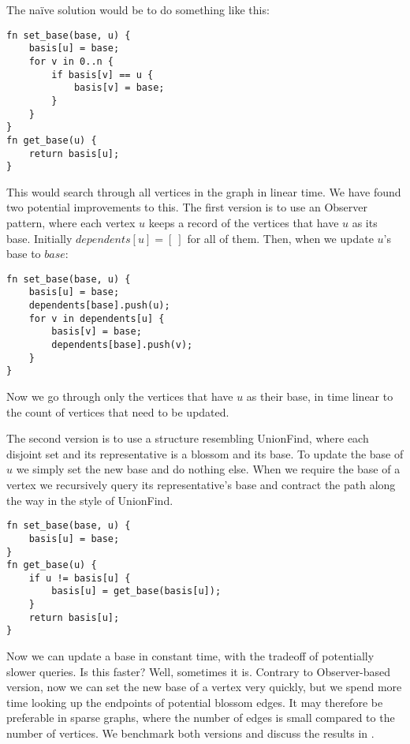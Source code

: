 The naïve solution would be to do something like this:
\begin{lstlisting}[caption={Näive basis},label=Listing,mathescape=true]
fn set_base(base, u) {
    basis[u] = base;
    for v in 0..n {
        if basis[v] == u {
            basis[v] = base;
        }
    }
}
fn get_base(u) {
    return basis[u];
}
\end{lstlisting}
This would search through all vertices in the graph in linear time. We have found two potential improvements to this. The first version is to use an Observer pattern, where each vertex $u$ keeps a record of the vertices that have $u$ as its base. Initially $dependents[u] = [~]$ for all of them. Then, when we update $u$'s base to $base$:

\begin{lstlisting}[caption={Observer basis},label=Listing,mathescape=true]
fn set_base(base, u) {
    basis[u] = base;
    dependents[base].push(u);
    for v in dependents[u] {
        basis[v] = base;
        dependents[base].push(v);
    }
}
\end{lstlisting}

Now we go through only the vertices that have $u$ as their base, in time linear to the count of vertices that need to be updated.

The second version is to use a structure resembling UnionFind, where each disjoint set and its representative is a blossom and its base. To update the base of $u$ we simply set the new base and do nothing else. When we require the base of a vertex we recursively query its representative's base and contract the path along the way in the style of UnionFind. 

\begin{lstlisting}[caption={UF-like basis},label=Listing,mathescape=true]
fn set_base(base, u) {
    basis[u] = base;
}
fn get_base(u) {
    if u != basis[u] {
        basis[u] = get_base(basis[u]);
    }
    return basis[u];
}
\end{lstlisting}

Now we can update a base in constant time, with the tradeoff of potentially slower queries. Is this faster? Well, sometimes it is. Contrary to Observer-based version, now we can set the new base of a vertex very quickly, but we spend more time looking up the endpoints of potential blossom edges. It may therefore be preferable in sparse graphs, where the number of edges is small compared to the number of vertices. We benchmark both versions and discuss the results in .
